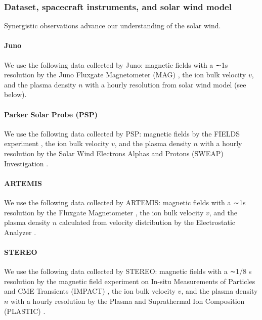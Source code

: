 \documentclass[
  letterpaper,
  DIV=11,
  numbers=noendperiod]{scrartcl}
\author{}
\date{}
\let\oldparagraph\paragraph
\renewcommand{\paragraph}[1]{\oldparagraph{#1}\mbox{}}
\begin{document}
\subsubsection{Dataset, spacecraft instruments, and solar wind
model}\label{dataset-spacecraft-instruments-and-solar-wind-model}

Synergistic observations \citep{velli2020} advance our understanding of
the solar wind.

\paragraph{Juno}\label{juno}

We use the following data collected by Juno: magnetic ﬁelds with a ∼1s
resolution by the Juno Fluxgate Magnetometer (MAG)
\citep{connerney2017}, the ion bulk velocity \(v\), and the plasma
density \(n\) with a hourly resolution from solar wind model (see
below).

\paragraph{Parker Solar Probe (PSP)}\label{parker-solar-probe-psp}

We use the following data collected by PSP: magnetic ﬁelds by the FIELDS
experiment \citep{bale2016}, the ion bulk velocity \(v\), and the plasma
density \(n\) with a hourly resolution by the Solar Wind Electrons
Alphas and Protons (SWEAP) Investigation \citep{kasper2016}.

\paragraph{ARTEMIS}\label{artemis}

We use the following data collected by ARTEMIS: magnetic ﬁelds with a
∼1s resolution by the Fluxgate Magnetometer \citep{auster2008}, the ion
bulk velocity \(v\), and the plasma density \(n\) calculated from
velocity distribution by the Electrostatic Analyzer
\citep{mcfadden2009}.

\paragraph{STEREO}\label{stereo}

We use the following data collected by STEREO: magnetic ﬁelds with a
∼1/8 s resolution by the magnetic ﬁeld experiment \citep{acuña2008} on
In-situ Measurements of Particles and CME Transients (IMPACT)
\citep{luhmann2008}, the ion bulk velocity \(v\), and the plasma density
\(n\) with a hourly resolution by the Plasma and Suprathermal Ion
Composition (PLASTIC) \citep{galvin2008}.
\end{document}
